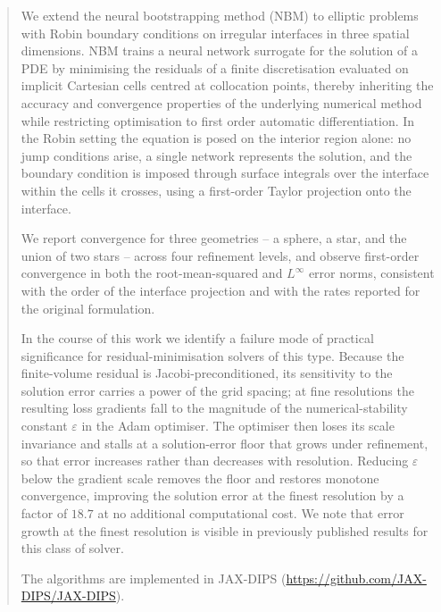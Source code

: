 \begin{abstract}
We extend the neural bootstrapping method (NBM) to elliptic problems with Robin
boundary conditions on irregular interfaces in three spatial dimensions. NBM trains a
neural network surrogate for the solution of a PDE by minimising the residuals of a
finite discretisation evaluated on implicit Cartesian cells centred at collocation
points, thereby inheriting the accuracy and convergence properties of the underlying
numerical method while restricting optimisation to first order automatic
differentiation. In the Robin setting the equation is posed on the interior region
alone: no jump conditions arise, a single network represents the solution, and the
boundary condition is imposed through surface integrals over the interface within the
cells it crosses, using a first-order Taylor projection onto the interface.

We report convergence for three geometries -- a sphere, a star, and the union of two
stars -- across four refinement levels, and observe first-order convergence in both
the root-mean-squared and $L^{\infty}$ error norms, consistent with the order of the
interface projection and with the rates reported for the original formulation.

In the course of this work we identify a failure mode of practical significance for
residual-minimisation solvers of this type. Because the finite-volume residual is
Jacobi-preconditioned, its sensitivity to the solution error carries a power of the
grid spacing; at fine resolutions the resulting loss gradients fall to the magnitude
of the numerical-stability constant $\varepsilon$ in the Adam optimiser. The optimiser
then loses its scale invariance and stalls at a solution-error floor that grows under
refinement, so that error increases rather than decreases with resolution. Reducing
$\varepsilon$ below the gradient scale removes the floor and restores monotone
convergence, improving the solution error at the finest resolution by a factor of
$18.7$ at no additional computational cost. We note that error growth at the finest
resolution is visible in previously published results for this class of solver.

The algorithms are implemented in JAX-DIPS
(\url{https://github.com/JAX-DIPS/JAX-DIPS}).
\end{abstract}
